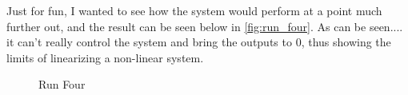 \begin{enumerate}
    Just for fun, I wanted to see how the system would perform at a point much further out, and the result can
    be seen below in \autoref{fig:run_four}. As can be seen.... it can't really control the system and
    bring the outputs to 0, thus showing the limits of linearizing a non-linear system.
    \begin{figure}[H]
  \begin{center}
  \end{center}
  \caption{Run Four}
  \label{fig:run_four}
\end{figure}

  \end{enumerate}